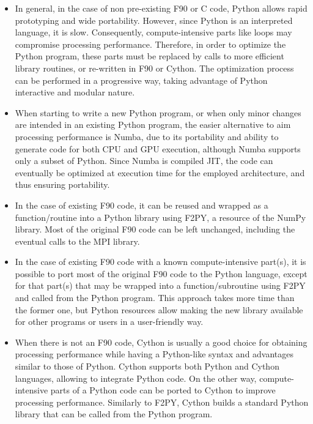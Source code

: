\begin{itemize}

\item In general, in the case of non pre-existing F90 or C code, Python allows rapid prototyping and wide portability. However, since Python is an interpreted language, it is slow. Consequently, compute-intensive parts like loops may compromise processing performance. Therefore, in order to optimize the Python program, these parts must be replaced by calls to more efficient library routines, or re-written in F90 or Cython. The optimization process can be performed in a progressive way, taking advantage of Python interactive and modular nature. 

\item When starting to write a new Python program, or when only minor changes are intended in an existing Python program, the easier alternative to aim processing performance is Numba, due to its portability and ability to generate code for both CPU and GPU execution, although Numba supports only a subset of Python. Since Numba is compiled JIT, the code can eventually be optimized at execution time for the employed architecture, and thus ensuring portability. 

\item In the case of existing F90 code, it can be reused and wrapped as a function/routine into a Python library using F2PY, a resource of the NumPy library. Most of the original F90 code can be left unchanged, including the eventual calls to the MPI library. 

\item In the case of existing F90 code with a known compute-intensive part(s), it is possible to port most of the original F90 code to the Python language, except for that part(s) that may be wrapped into a function/subroutine using F2PY and called from the Python program. This approach  takes more time than the former one, but Python resources allow making the new library available for other programs or users in a user-friendly way. 

\item When there is not an F90 code, Cython is usually a good choice for obtaining processing performance while having a Python-like syntax and advantages similar to those of Python. Cython supports both Python and Cython languages, allowing to integrate Python code. On the other way, compute-intensive parts of a Python code can be ported to Cython to improve processing performance. Similarly to F2PY, Cython builds a standard Python library that can be called from the Python program.


\end{itemize}
